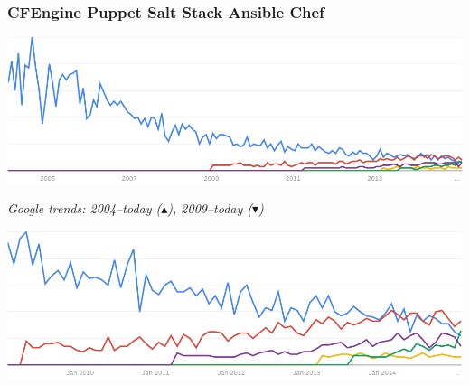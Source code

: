 \documentclass[english,serif,mathserif,usenames,dvipsnames]{beamer}
\begin{document}
\begin{frame}
  \frametitle{%
    {\color{blue} CFEngine}
    {\color{red} Puppet}
    {\color{yellow} Salt Stack}
    {\color{green} Ansible}
    {\color{violet} Chef}
  }%
  \begin{center}
    \includegraphics[width=1.0\linewidth]{google-trends-since-2004.png}

    {\footnotesize\em Google trends:
      2004--today ($\blacktriangle$),
      2009--today ($\blacktriangledown$)}

    \includegraphics[width=1.0\linewidth]{google-trends-since-2009.png}
  \end{center}
\end{frame}
\end{document}
